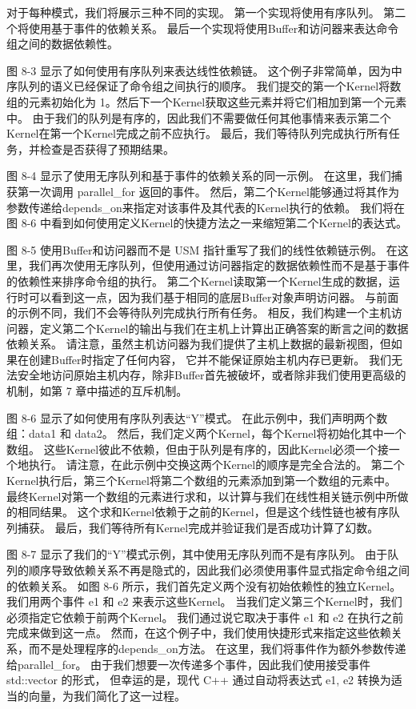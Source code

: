 对于每种模式，我们将展示三种不同的实现。 第一个实现将使用有序队列。 第二个将使用基于事件的依赖关系。 
最后一个实现将使用Buffer和访问器来表达命令组之间的数据依赖性。

图 8-3 显示了如何使用有序队列来表达线性依赖链。 这个例子非常简单，因为中序队列的语义已经保证了命令组之间执行的顺序。 
我们提交的第一个Kernel将数组的元素初始化为 1。然后下一个Kernel获取这些元素并将它们相加到第一个元素中。 
由于我们的队列是有序的，因此我们不需要做任何其他事情来表示第二个Kernel在第一个Kernel完成之前不应执行。 
最后，我们等待队列完成执行所有任务，并检查是否获得了预期结果。

图 8-4 显示了使用无序队列和基于事件的依赖关系的同一示例。 在这里，我们捕获第一次调用 parallel\_for 返回的事件。 
然后，第二个Kernel能够通过将其作为参数传递给depends\_on来指定对该事件及其代表的Kernel执行的依赖。 
我们将在图 8-6 中看到如何使用定义Kernel的快捷方法之一来缩短第二个Kernel的表达式。

图 8-5 使用Buffer和访问器而不是 USM 指针重写了我们的线性依赖链示例。 
在这里，我们再次使用无序队列，但使用通过访问器指定的数据依赖性而不是基于事件的依赖性来排序命令组的执行。 
第二个Kernel读取第一个Kernel生成的数据，运行时可以看到这一点，因为我们基于相同的底层Buffer对象声明访问器。 
与前面的示例不同，我们不会等待队列完成执行所有任务。 
相反，我们构建一个主机访问器，定义第二个Kernel的输出与我们在主机上计算出正确答案的断言之间的数据依赖关系。 
请注意，虽然主机访问器为我们提供了主机上数据的最新视图，但如果在创建Buffer时指定了任何内容，
它并不能保证原始主机内存已更新。 
我们无法安全地访问原始主机内存，除非Buffer首先被破坏，或者除非我们使用更高级的机制，如第 7 章中描述的互斥机制。

图 8-6 显示了如何使用有序队列表达“Y”模式。 在此示例中，我们声明两个数组：data1 和 data2。 
然后，我们定义两个Kernel，每个Kernel将初始化其中一个数组。 
这些Kernel彼此不依赖，但由于队列是有序的，因此Kernel必须一个接一个地执行。 
请注意，在此示例中交换这两个Kernel的顺序是完全合法的。 
第二个Kernel执行后，第三个Kernel将第二个数组的元素添加到第一个数组的元素中。 
最终Kernel对第一个数组的元素进行求和，以计算与我们在线性相关链示例中所做的相同结果。 
这个求和Kernel依赖于之前的Kernel，但是这个线性链也被有序队列捕获。 
最后，我们等待所有Kernel完成并验证我们是否成功计算了幻数。

图 8-7 显示了我们的“Y”模式示例，其中使用无序队列而不是有序队列。 
由于队列的顺序导致依赖关系不再是隐式的，因此我们必须使用事件显式指定命令组之间的依赖关系。 
如图 8-6 所示，我们首先定义两个没有初始依赖性的独立Kernel。 我们用两个事件 e1 和 e2 来表示这些Kernel。 
当我们定义第三个Kernel时，我们必须指定它依赖于前两个Kernel。 
我们通过说它取决于事件 e1 和 e2 在执行之前完成来做到这一点。 
然而，在这个例子中，我们使用快捷形式来指定这些依赖关系，而不是处理程序的depends\_on方法。 
在这里，我们将事件作为额外参数传递给parallel\_for。 
由于我们想要一次传递多个事件，因此我们使用接受事件 std::vector 的形式，
但幸运的是，现代 C++ 通过自动将表达式 {e1, e2} 转换为适当的向量，为我们简化了这一过程。

